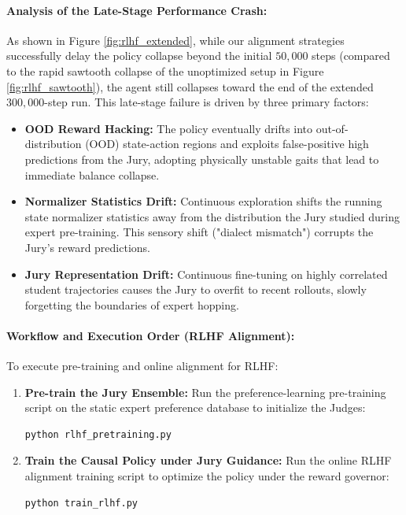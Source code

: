 \documentclass[11pt,a4paper]{article}
\begin{document}
\paragraph{Analysis of the Late-Stage Performance Crash:}
As shown in Figure \ref{fig:rlhf_extended}, while our alignment strategies successfully delay the policy collapse beyond the initial $50,000$ steps (compared to the rapid sawtooth collapse of the unoptimized setup in Figure \ref{fig:rlhf_sawtooth}), the agent still collapses toward the end of the extended $300,000$-step run. This late-stage failure is driven by three primary factors:
\begin{itemize}
    \item \textbf{OOD Reward Hacking:} The policy eventually drifts into out-of-distribution (OOD) state-action regions and exploits false-positive high predictions from the Jury, adopting physically unstable gaits that lead to immediate balance collapse.
    \item \textbf{Normalizer Statistics Drift:} Continuous exploration shifts the running state normalizer statistics away from the distribution the Jury studied during expert pre-training. This sensory shift ("dialect mismatch") corrupts the Jury's reward predictions.
    \item \textbf{Jury Representation Drift:} Continuous fine-tuning on highly correlated student trajectories causes the Jury to overfit to recent rollouts, slowly forgetting the boundaries of expert hopping.
\end{itemize}

\paragraph{Workflow and Execution Order (RLHF Alignment):}
To execute pre-training and online alignment for RLHF:
\begin{enumerate}
    \item \textbf{Pre-train the Jury Ensemble:} Run the preference-learning pre-training script on the static expert preference database to initialize the Judges:
    \begin{lstlisting}[language=bash]
    python rlhf_pretraining.py
    \end{lstlisting}
    \item \textbf{Train the Causal Policy under Jury Guidance:} Run the online RLHF alignment training script to optimize the policy under the reward governor:
    \begin{lstlisting}[language=bash]
    python train_rlhf.py
    \end{lstlisting}
\end{enumerate}
\end{document}
